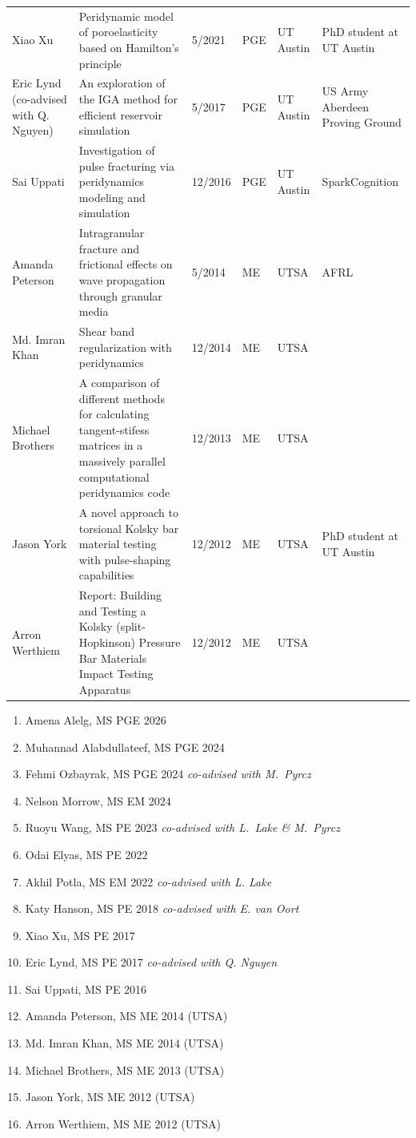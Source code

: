 {\begin{center}
\begin{longtable}{p{1.7cm}p{6.5cm}P{1.2cm}P{1.2cm}P{1.2cm}p{2.0cm}}
      Xiao Xu & Peridynamic model of poroelasticity based on Hamilton's principle & 5/2021 & PGE & UT Austin & PhD student at UT Austin\\
      Eric Lynd \newline (co-advised with Q. Nguyen) & An exploration of the IGA method for efficient reservoir simulation & 5/2017 & PGE & UT Austin & US Army Aberdeen Proving Ground \\
      Sai Uppati & Investigation of pulse fracturing via peridynamics modeling and simulation & 12/2016 & PGE & UT Austin & SparkCognition \\
      Amanda Peterson & Intragranular fracture and frictional effects on wave propagation through granular media & 5/2014 & ME & UTSA & AFRL \\
      Md. Imran Khan & Shear band regularization with peridynamics & 12/2014 & ME & UTSA &  \\
      Michael Brothers & A comparison of different methods for calculating tangent-stifess matrices in a massively parallel computational peridynamics code & 12/2013 & ME & UTSA &  \\
      Jason York & A novel approach to torsional Kolsky bar material testing with pulse-shaping capabilities & 12/2012 & ME & UTSA & PhD student at UT Austin \\
      Arron Werthiem & Report: Building and Testing a Kolsky (split-Hopkinson) Pressure Bar Materials Impact Testing Apparatus & 12/2012 & ME & UTSA &  \\
      \bottomrule
    \end{longtable}
  \end{center}
}
\else
\begin{enumerate}
    \item Amena Alelg, MS PGE 2026
    \item Muhannad Alabdullateef, MS PGE 2024 
    \item Fehmi Ozbayrak, MS PGE 2024 \emph{co-advised with M.\ Pyrcz}
    \item Nelson Morrow, MS EM 2024
    \item Ruoyu Wang, MS PE 2023 \emph{co-advised with L.\ Lake \& M.\ Pyrcz}
    \item Odai Elyas, MS PE 2022
    \item Akhil Potla, MS EM 2022 \emph{co-advised with L. Lake} 
    \item Katy Hanson, MS PE 2018 \emph{co-advised with E. van Oort} 
    \item Xiao Xu, MS PE 2017
    \item Eric Lynd, MS PE 2017  \emph{co-advised with Q. Nguyen}
    \item Sai Uppati, MS PE 2016
    \item Amanda Peterson, MS ME 2014 (UTSA)
    \item Md. Imran Khan, MS ME 2014 (UTSA)
    \item Michael Brothers, MS ME 2013 (UTSA)
    \item Jason York, MS ME 2012 (UTSA)
    \item Arron Werthiem, MS ME 2012 (UTSA)
\end{enumerate}
\fi

